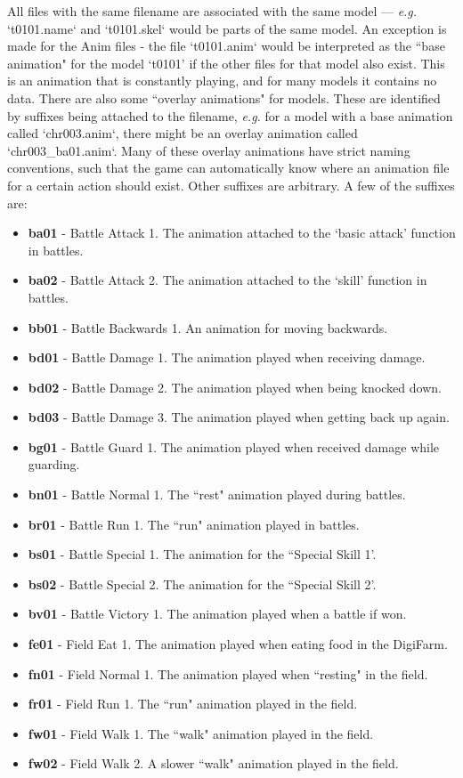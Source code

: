 \documentclass{article}
\begin{document}
All files with the same filename are associated with the same model --- \textit{e.g.} `t0101.name` and `t0101.skel` would be parts of the same model. An exception is made for the Anim files - the file `t0101.anim` would be interpreted as the ``base animation" for the model `t0101' if the other files for that model also exist. This is an animation that is constantly playing, and for many models it contains no data. There are also some ``overlay animations" for models. These are identified by suffixes being attached to the filename, \textit{e.g.} for a model with a base animation called `chr003.anim`, there might be an overlay animation called `chr003\_ba01.anim`. Many of these overlay animations have strict naming conventions, such that the game can automatically know where an animation file for a certain action should exist. Other suffixes are arbitrary. A few of the suffixes are:
\begin{itemize}
\item \textbf{ba01} - Battle Attack 1. The animation attached to the `basic attack' function in battles.
\item \textbf{ba02} - Battle Attack 2. The animation attached to the `skill' function in battles.
\item \textbf{bb01} - Battle Backwards 1. An animation for moving backwards.
\item \textbf{bd01} - Battle Damage 1. The animation played when receiving damage.
\item \textbf{bd02} - Battle Damage 2. The animation played when being knocked down.
\item \textbf{bd03} - Battle Damage 3. The animation played when getting back up again.
\item \textbf{bg01} - Battle Guard 1. The animation played when received damage while guarding.
\item \textbf{bn01} - Battle Normal 1. The ``rest" animation played during battles.
\item \textbf{br01} - Battle Run 1. The ``run" animation played in battles.
\item \textbf{bs01} - Battle Special 1. The animation for the ``Special Skill 1'.
\item \textbf{bs02} - Battle Special 2. The animation for the ``Special Skill 2'.
\item \textbf{bv01} - Battle Victory 1. The animation played when a battle if won.
\item \textbf{fe01} - Field Eat 1. The animation played when eating food in the DigiFarm.
\item \textbf{fn01} - Field Normal 1. The animation played when ``resting" in the field.
\item \textbf{fr01} - Field Run 1. The ``run" animation played in the field.
\item \textbf{fw01} - Field Walk 1. The ``walk" animation played in the field.
\item \textbf{fw02} - Field Walk 2. A slower ``walk" animation played in the field.
\end{itemize}
\end{document}
